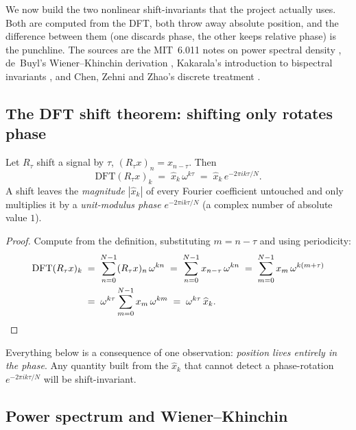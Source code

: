 We now build the two nonlinear shift-invariants that the project actually uses. Both
are computed from the DFT, both throw away absolute position, and the difference between
them (one discards phase, the other keeps relative phase) is the punchline. The
sources are the MIT~6.011 notes on power spectral density \citep{invariants_mit6011},
de~Buyl's Wiener--Khinchin derivation \citep{invariants_wienerkhinchin}, Kakarala's
introduction to bispectral invariants \citep{invariants_kakarala}, and Chen, Zehni and
Zhao's discrete treatment \citep{invariants_chen}.

\subsection{The DFT shift theorem: shifting only rotates phase}

\begin{lemma}
\label{lem:shifttheorem}
Let $R_\tau$ shift a signal by $\tau$, $(R_\tau x)_n = x_{n-\tau}$. Then
\[
  \mathrm{DFT}(R_\tau x)_k \;=\; \widehat{x}_k\, \omega^{k\tau}
                          \;=\; \widehat{x}_k\, e^{-2\pi i k \tau / N}.
\]
A shift leaves the \emph{magnitude} $|\widehat x_k|$ of every Fourier coefficient
untouched and only multiplies it by a \emph{unit-modulus phase} $e^{-2\pi i k\tau/N}$
(a complex number of absolute value $1$).
\end{lemma}

\begin{proof}
Compute from the definition, substituting $m = n - \tau$ and using periodicity:
\begin{align*}
  \mathrm{DFT}(R_\tau x)_k
    \;&=\; \sum_{n=0}^{N-1} (R_\tau x)_n\, \omega^{kn}
    \;=\; \sum_{n=0}^{N-1} x_{n-\tau}\, \omega^{kn}
    \;=\; \sum_{m=0}^{N-1} x_{m}\, \omega^{k(m+\tau)} \\
    \;&=\; \omega^{k\tau}\sum_{m=0}^{N-1} x_m\,\omega^{km}
    \;=\; \omega^{k\tau}\,\widehat x_k. \qedhere
\end{align*}
\end{proof}

Everything below is a consequence of one observation: \emph{position lives entirely in
the phase}. Any quantity built from the $\widehat x_k$ that cannot detect a
phase-rotation $e^{-2\pi i k\tau/N}$ will be shift-invariant.

\subsection{Power spectrum and Wiener--Khinchin}

